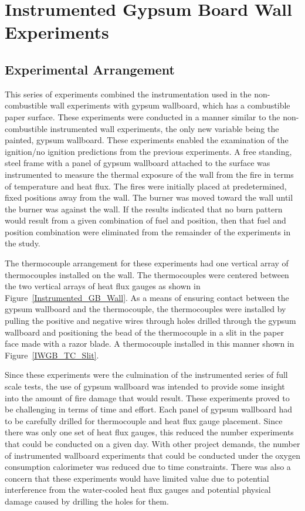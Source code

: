 \documentclass[twoside]{uocthesis}
\begin{document}
{\chapter{Instrumented Gypsum Board Wall Experiments}

\section{Experimental Arrangement}
This series of experiments combined the instrumentation used in the non-combustible wall experiments with gypsum wallboard, which has a combustible paper surface. These experiments were conducted in a manner similar to the non-combustible instrumented wall experiments, the only new variable being the painted, gypsum wallboard. These experiments enabled the examination of the ignition/no ignition predictions from the previous experiments.  A free standing, steel frame with a panel of gypsum wallboard attached to the surface was instrumented to measure the thermal exposure of the wall from the fire in terms of temperature and heat flux.  The fires were initially placed at predetermined, fixed positions away from the wall. The burner was moved toward the wall until the burner was against the wall.  If the results indicated that no burn pattern would result from a given combination of fuel and position, then that fuel and position combination were eliminated from the remainder of the experiments in the study.

The thermocouple arrangement for these experiments had one vertical array of thermocouples installed on the wall.  The thermocouples were centered between the two vertical arrays of heat flux gauges as shown in Figure~\ref{Instrumented_GB_Wall}.  As a means of ensuring contact between the gypsum wallboard and the thermocouple, the thermocouples were installed by pulling the positive and negative wires through holes drilled through the gypsum wallboard and positioning the bead of the thermocouple in a slit in the paper face made with a razor blade.  A thermocouple installed in this manner shown in Figure~\ref{IWGB_TC_Slit}.

Since these experiments were the culmination of the instrumented series of full scale tests, the use of gypsum wallboard was intended to provide some insight into the amount of fire damage that would result. These experiments proved to be challenging in terms of time and effort.  Each panel of gypsum wallboard had to be carefully drilled for thermocouple and heat flux gauge placement. Since there was only one set of heat flux gauges, this reduced the number experiments that could be conducted on a given day.  With other project demands, the number of instrumented wallboard experiments that could be conducted under the oxygen consumption calorimeter was reduced due to time constraints. There was also a concern that these experiments would have limited value due to potential interference from the water-cooled heat flux gauges and potential physical damage caused by drilling the holes for them.

}
\end{document}
